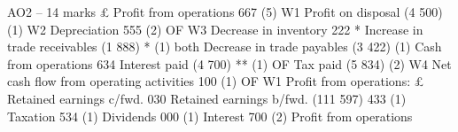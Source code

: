 \documentclass{article}
\begin{document}
AO2 – 14 marks \newline
 \newline
 \newline
£ \newline
Profit from operations  667 (5) W1 \newline
Profit on disposal \newline
(4 500) (1) W2 \newline
Depreciation  555 (2) OF W3 \newline
Decrease in inventory  222 * \newline
Increase in trade receivables \newline
(1 888) * (1) both \newline
Decrease in trade payables \newline
(3 422) (1) \newline
Cash from operations  634   \newline
Interest paid \newline
(4 700) ** (1) OF \newline
Tax paid \newline
(5 834) (2) W4 \newline
Net cash flow from operating activities  100 (1) OF  \newline
 \newline
W1 Profit from operations: \newline
 \newline
 \newline
£ \newline
Retained earnings c/fwd.  030 \newline
Retained earnings b/fwd. \newline
(111 597) \newline
  433 (1) \newline
Taxation  534 (1) \newline
Dividends  000 (1) \newline
Interest  700 (2) \newline
Profit from operations \newline
\end{document}
